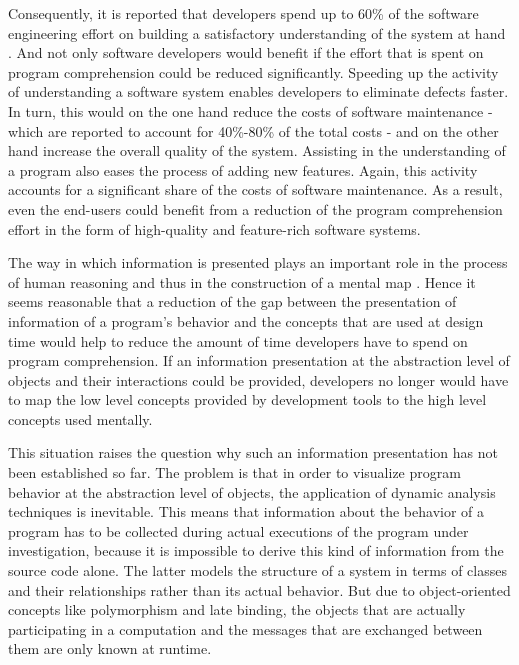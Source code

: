 Consequently, it is reported that developers spend up to 60\% of the software engineering effort on building a satisfactory understanding of the system at hand \cite{corbi_program_1989, basili_evolving_1997, ducasse_class_2005, rothlisberger_feature_2007, cornelissen_execution_2008}.
And not only software developers would benefit if the effort that is spent on program comprehension could be reduced significantly.
Speeding up the activity of understanding a software system enables developers to eliminate defects faster.
In turn, this would on the one hand reduce the costs of software maintenance - which are reported to account for 40\%-80\% of the total costs \cite{glass_frequently_2001} - and on the other hand increase the overall quality of the system.
Assisting in the understanding of a program also eases the process of adding new features.
Again, this activity accounts for a significant share of the costs of software maintenance.
As a result, even the end-users could benefit from a reduction of the program comprehension effort in the form of high-quality and feature-rich software systems.

The way in which information is presented plays an important role in the process of human reasoning and thus in the construction of a mental map \cite{diehl_software_2007}.
Hence it seems reasonable that a reduction of the gap between the presentation of information of a program's behavior and the concepts that are used at design time would help to reduce the amount of time developers have to spend on program comprehension.
If an information presentation at the abstraction level of objects and their interactions could be provided, developers no longer would have to map the low level concepts provided by development tools to the high level concepts used mentally.

This situation raises the question why such an information presentation has not been established so far.
The problem is that in order to visualize program behavior at the abstraction level of objects, the application of dynamic analysis techniques is inevitable.
This means that information about the behavior of a program has to be collected during actual executions of the program under investigation, because it is impossible to derive this kind of information from the source code alone.
The latter models the structure of a system in terms of classes and their relationships rather than its actual behavior.
But due to object-oriented concepts like polymorphism and late binding, the objects that are actually participating in a computation and the messages that are exchanged between them are only known at runtime.

